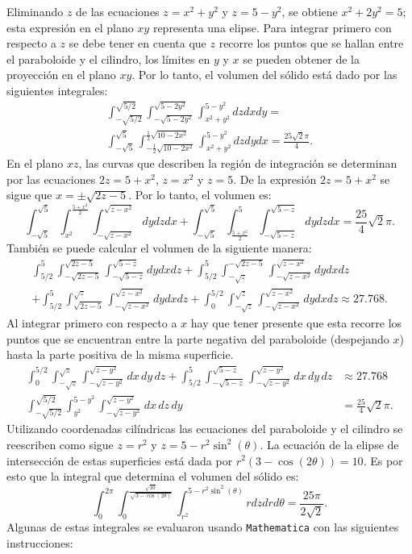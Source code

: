 Eliminando $z$ de las ecuaciones $z=x^2+y^2$ y $z=5-y^2$, se obtiene $x^2+2y^2=5$; esta expresión en el plano $xy$ representa una elipse.
Para integrar primero con respecto a $z$ se debe tener en cuenta que $z$ recorre los puntos que se hallan entre el paraboloide y el cilindro, los límites en $y$ y $x$ se pueden obtener de la proyección en el plano $xy$. Por lo tanto, el volumen del sólido está dado por las siguientes integrales:
\begin{multline*} \int_{-\sqrt{5/2}}^{\sqrt{5/2}}\int_{-\sqrt{5-2y^2}}^{\sqrt{5-2y^2}}\int_{x^2+y^2}^{5-y^2}dzdxdy = \\ \int_{-\sqrt{5}}^{\sqrt{5}}\int_{-\frac{1}{2}\sqrt{10-2x^2}}^{\frac{1}{2}\sqrt{10-2x^2}}\int_{x^2+y^2}^{5-y^2}dzdydx= \frac{25\sqrt{2}\pi}{4}.
\end{multline*}
En el plano $xz$, las curvas que describen la región de integración se determinan por las ecuaciones $2z=5+x^2$, $z=x^2$ y $z=5$.
De la expresión $2z=5+x^2$ se sigue que $ x=\pm \sqrt{2z-5}$. Por lo tanto, el volumen es:
\[\int_{-\sqrt{5}}^{\sqrt{5}}\int_{x^2}^{\frac{5+x^2}{2}}\int_{-\sqrt{z-x^2}}^{\sqrt{z-x^2}}dydzdx+\int_{-\sqrt{5}}^{\sqrt{5}}\int_{\frac{5+x^2}{2}}^{5}\int_{-\sqrt{5-z}}^{\sqrt{5-z}}dydzdx= \frac{25}{4}\sqrt{2}\pi.\]
También se puede calcular el volumen de la siguiente manera:
\begin{multline*}
\int_{5/2}^{5}\int_{-\sqrt{2z-5}}^{\sqrt{2z-5}}\int_{-\sqrt{5-z}}^{\sqrt{5-z}}dydxdz+\int_{5/2}^{5}\int_{-\sqrt{z}}^{-\sqrt{2z-5}}\int_{-\sqrt{z-x^2}}^{\sqrt{z-x^2}}dydxdz\\
+\int_{5/2}^{5}\int_{\sqrt{2z-5}}^{\sqrt{z}}\int_{-\sqrt{z-x^2}}^{\sqrt{z-x^2}}dydxdz+\int_{0}^{5/2}\int_{-\sqrt{z}}^{\sqrt{z}}\int_{-\sqrt{z-x^2}}^{\sqrt{z-x^2}}dydxdz\approx 27.768.
\end{multline*}
Al integrar primero con respecto a $x$ hay que tener presente que esta recorre los puntos que se encuentran entre la parte negativa del paraboloide (despejando $x$)
hasta la parte positiva de la misma superficie.
\begin{align*}
\int_{0}^{5/2}
\int_{-\sqrt{z}}^{\sqrt{z}}
\int_{-\sqrt{z - y^2}}^{\sqrt{z - y^2}}
dx\,dy\,dz
+
\int_{5/2}^{5}
\int_{-\sqrt{5 - z}}^{\sqrt{5 - z}}
\int_{-\sqrt{z - y^2}}^{\sqrt{z - y^2}}
dx\,dy\,dz
&\approx 27.768 \\
\int_{-\sqrt{5/2}}^{\sqrt{5/2}}
\int_{y^2}^{5 - y^2}
\int_{-\sqrt{z - y^2}}^{\sqrt{z - y^2}}
dx\,dz\,dy
&= \frac{25}{4}\sqrt{2}\pi.
\end{align*}
Utilizando coordenadas cilíndricas las ecuaciones del paraboloide y el cilindro se reescriben como sigue
$z=r^2$ y $z=5-r^2\sin^2(\theta)$. La ecuación de la elipse de intersección de estas superficies está dada por
$ r^2 (3- \cos(2 \theta))=10$.
Es por esto que la integral que determina el volumen del sólido es:
\[\int_0^{2\pi}\int_0^{\frac{\sqrt{10}}{\sqrt{3-\cos(2\theta)}}}\int_{r^2}^{5-r^2\sin ^2(\theta)}rdzdrd\theta=\frac{25\pi}{2\sqrt{2}}.\]
Algunas de estas integrales se evaluaron usando \verb"Mathematica" con las siguientes instrucciones:

